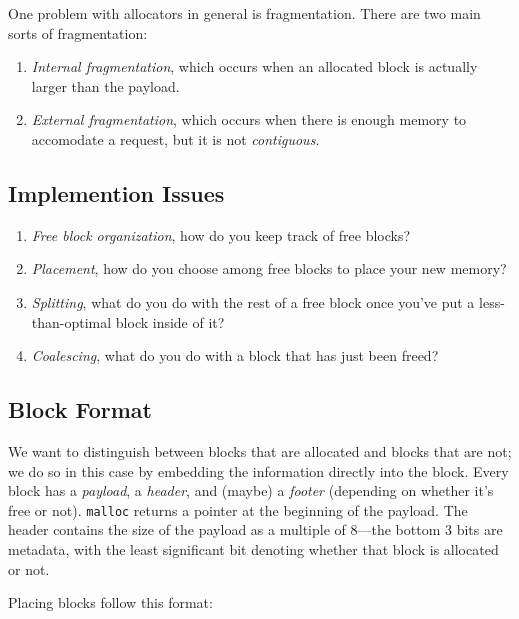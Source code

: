 \documentclass[fleqn]{article}
\begin{document}
One problem with allocators in general is fragmentation. There are two main sorts of fragmentation:

\begin{enumerate}
\item \textit{Internal fragmentation}, which occurs when an allocated block is actually larger than the payload.

\item \textit{External fragmentation}, which occurs when there is enough memory to accomodate a request, but it is not \textit{contiguous}.
\end{enumerate}

\subsection{Implemention Issues}

\begin{enumerate}
\item \textit{Free block organization}, how do you keep track of free blocks?

\item \textit{Placement}, how do you choose among free blocks to place your new memory?

\item \textit{Splitting}, what do you do with the rest of a free block once you've put a less-than-optimal block inside of it?

\item \textit{Coalescing}, what do you do with a block that has just been freed?
\end{enumerate}

\subsection{Block Format}

We want to distinguish between blocks that are allocated and blocks that are not; we do so in this case by embedding the information directly into the block. Every block has a \textit{payload}, a \textit{header}, and (maybe) a \textit{footer} (depending on whether it's free or not). \texttt{malloc} returns a pointer at the beginning of the payload. The header contains the size of the payload as a multiple of 8---the bottom 3 bits are metadata, with the least significant bit denoting whether that block is allocated or not.

Placing blocks follow this format:
\end{document}
